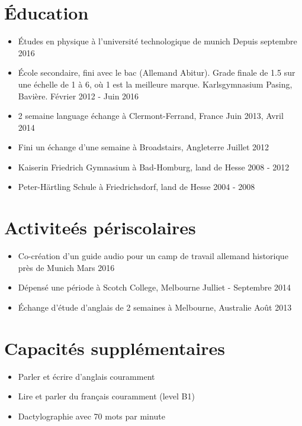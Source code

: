 \documentclass[11pt,a4paper]{article}
\begin{document}
\section*{Éducation}
\begin{itemize}
	\setlength{\itemsep}{1pt}
	\item[] Études en physique à l'université technologique de munich \hfill Depuis septembre 2016
	\item[] École secondaire, fini avec le bac (Allemand Abitur).
	Grade finale de 1.5 sur une échelle de 1 à 6, où 1 est la meilleure marque. Karlsgymnasium Pasing, Bavière.
	\hfill Février 2012 - Juin 2016
	\item[] 2 semaine language échange à Clermont-Ferrand, France
	\hfill Juin 2013, Avril 2014
	\item[] Fini un échange d'une semaine à Broadstairs, Angleterre \hfill Juillet 2012
	\item[] Kaiserin Friedrich Gymnasium à Bad-Homburg, land de Hesse \hfill 2008 - 2012
	\item[] Peter-Härtling Schule à Friedrichsdorf, land de Hesse \hfill 2004 - 2008
\end{itemize}

\section*{Activiteés périscolaires}
\begin{itemize}
	\setlength{\itemsep}{1pt}
	\item[] Co-création d'un guide audio pour un camp de travail allemand historique près de Munich
	\hfill Mars 2016
	\item[] Dépensé une période à Scotch College, Melbourne \hfill Julliet - Septembre 2014
	\item[] Échange d'étude d'anglais de 2 semaines à Melbourne, Australie \hfill Août 2013
\end{itemize}

\section*{Capacités supplémentaires}
\begin{itemize}
	\setlength{\itemsep}{1pt}
	\item Parler et écrire d'anglais couramment
	\item Lire et parler du français couramment (level B1)
	\item Dactylographie avec 70 mots par minute
\end{itemize}
\end{document}
